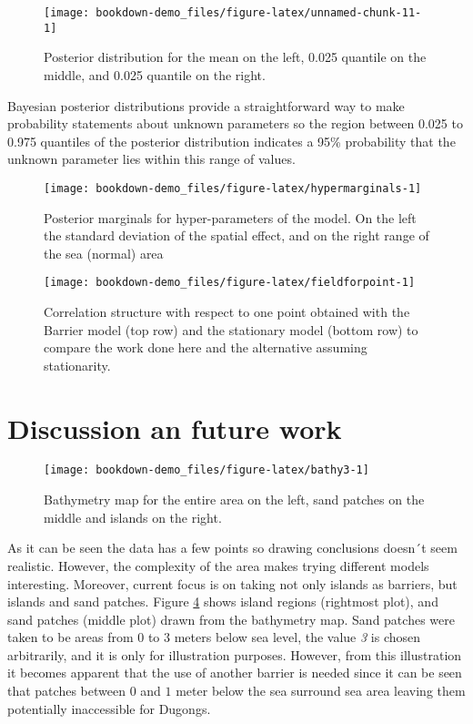 \documentclass[
]{book}
\begin{document}
\begin{figure}
\texttt{[image: bookdown-demo\_files/figure-latex/unnamed-chunk-11-1]} \caption{Posterior distribution for the mean on the left, 0.025 quantile on the middle, and 0.025 quantile on the right.}\label{fig:unnamed-chunk-11}
\end{figure}

Bayesian posterior distributions provide a straightforward way to make probability statements about unknown parameters so the region between 0.025 to 0.975 quantiles of the posterior distribution indicates a 95\% probability that the unknown parameter lies within this range of values.

\begin{figure}
\texttt{[image: bookdown-demo\_files/figure-latex/hypermarginals-1]} \caption{Posterior marginals for hyper-parameters of the model. On the left the standard deviation of the spatial effect, and on the right range of the sea (normal) area}\label{fig:hypermarginals}
\end{figure}

\begin{figure}
\texttt{[image: bookdown-demo\_files/figure-latex/fieldforpoint-1]} \caption{Correlation structure with respect to one point obtained with the Barrier model (top row) and the stationary model (bottom row) to compare the work done here and the alternative assuming stationarity.}\label{fig:fieldforpoint}
\end{figure}

\hypertarget{discussion-an-future-work}{%
\section{Discussion an future work}\label{discussion-an-future-work}}

\begin{figure}
\texttt{[image: bookdown-demo\_files/figure-latex/bathy3-1]} \caption{Bathymetry map for the entire area on the left, sand patches on the middle and islands on the right.}\label{fig:bathy3}
\end{figure}

As it can be seen the data has a few points so drawing conclusions doesn´t seem realistic. However, the complexity of the area makes trying different models interesting. Moreover, current focus is on taking not only islands as barriers, but islands and sand patches. Figure \ref{fig:bathy3} shows island regions (rightmost plot), and sand patches (middle plot) drawn from the bathymetry map. Sand patches were taken to be areas from \(0\) to \(3\) meters below sea level, the value \emph{3} is chosen arbitrarily, and it is only for illustration purposes. However, from this illustration it becomes apparent that the use of another barrier is needed since it can be seen that patches between \(0\) and \(1\) meter below the sea surround sea area leaving them potentially inaccessible for Dugongs.
\end{document}
